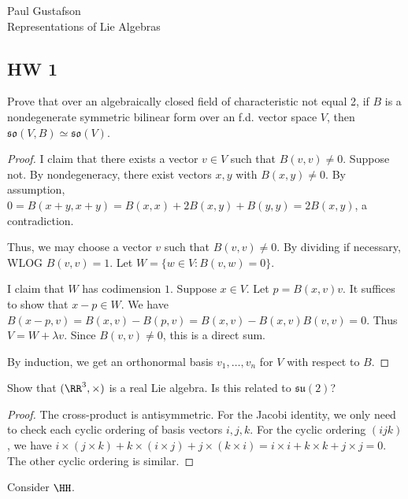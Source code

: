 \documentclass{article}
\begin{document}
\noindent Paul Gustafson\\
\noindent Representations of Lie Algebras

\subsection*{HW 1}
 Prove that over an algebraically closed field of characteristic not equal 2, if $B$ is a nondegenerate symmetric bilinear form over an f.d. vector space $V$, then $\mathfrak{so}(V,B) \simeq \mathfrak{so}(V)$.
\begin{proof}
I claim that there exists a vector $v \in V$ such that $B(v,v) \neq 0$.  Suppose not.  By nondegeneracy, there exist vectors $x,y$ with $B(x,y) \neq 0$.  By assumption, $0 = B(x+y, x+y) = B(x,x) + 2B(x,y) + B(y,y) = 2B(x,y)$, a contradiction.

Thus, we may choose a vector $v$ such that $B(v,v) \neq 0$. By dividing if necessary, WLOG $B(v,v) = 1$.  Let $W = \{w \in V : B(v,w) = 0\}$.  

I claim that $W$ has codimension $1$.  Suppose $x \in V$.  Let $p = B(x,v) v$.   It suffices to show that $x - p \in W$.  We have $B(x-p, v) = B(x,v) - B(p,v) = B(x,v) - B(x,v) B(v,v) = 0$.  Thus $V = W + \lambda v$.  Since $B(v,v) \neq 0$, this is a direct sum.

By induction, we get an orthonormal basis $v_1, \ldots, v_n$ for $V$ with respect to $B$.
\end{proof}

  Show that $(\RR^3, \times)$ is a real Lie algebra.  Is this related to $\mathfrak{su}(2)$?
\begin{proof}
The cross-product is antisymmetric.  For the Jacobi identity, we only need to check each cyclic ordering of basis vectors $i, j, k$.  For the cyclic ordering $(ijk)$, we have
$i \times (j \times k) + k \times (i \times j) + j \times (k \times i) = i \times i + k \times k + j \times j = 0$.  The other cyclic ordering is similar.


\end{proof}

 Consider $\HH$.
\end{document}
